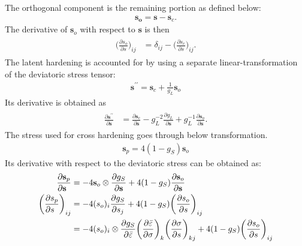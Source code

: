 \documentclass[12pt]{amsart}
\begin{document}
The orthogonal component is the remaining portion as defined below:
\begin{eqnarray}
  \label{eq:decomp3}
  \mathbf{s_o} = \mathbf{s} - \mathbf{s}_c.
\end{eqnarray}
The derivative of $\mathbf{s}_o$ with respect to $\mathbf{s}$ is then
\begin{eqnarray}
  \label{eq:decomp4}
  \begin{split}
    \bigg(\frac{\partial s_o}{\partial s}\bigg)_{ij} &= \delta_{ij}- \bigg(\frac{\partial s_c}{\partial s}\bigg)_{ij}.
  \end{split}
\end{eqnarray}
The latent hardening is accounted for by using a separate linear-transformation of the deviatoric stress tensor:
\begin{eqnarray}
  \label{eq:latent_decompose1}
  \mathbf{s}^{\prime\prime}=\mathbf{s}_c+\frac{1}{g_L}\mathbf{s}_o
\end{eqnarray}
Its derivative is obtained as
\begin{eqnarray}
  \begin{split}
    \label{eq:latent_decompose2}
    \frac{\partial\mathbf{s}^{\prime\prime}}{\partial\mathbf{s}} &=\frac{\partial\mathbf{s}_c}{\partial\mathbf{s}}-g_L^{-2}\frac{\partial g_L}{\partial \mathbf{s}} +g_L^{-1} \frac{\partial\mathbf{s}_o}{\partial\mathbf{s}}.
  \end{split}
\end{eqnarray}
The stress used for cross hardening goes through below transformation.
\begin{eqnarray}
  \label{eq:cross_linear1}
  \mathbf{s}_p = 4(1-g_S)\mathbf{s}_o
\end{eqnarray}
Its derivative with respect to the deviatoric stress can be obtained as:
\begin{eqnarray}
  \begin{split}
    \label{eq:cross_linear2}
    \frac{\partial\mathbf{s}_p}{\partial\mathbf{s}\hfill}  &= -4\mathbf{s}_o\otimes\frac{\partial g_S}{\partial \mathbf{s}}+4(1-g_S) \frac{\partial\mathbf{s}_o}{\partial\mathbf{s}} \\
    \bigg(\frac{\partial s_p}{\partial s\hfill} \bigg)_{ij} &= -4(s_o)_i\frac{\partial g_S}{\partial s_j} + 4(1-g_S) \bigg(\frac{\partial s_o}{\partial s}\bigg)_{ij}\\
    &= -4(s_o)_i\otimes\frac{\partial g_S}{\partial \bar{\varepsilon}}\bigg(\frac{\partial\bar{\varepsilon}}{\partial\sigma}\bigg)_k\bigg(\frac{\partial\sigma}{\partial s}\bigg)_{kj} + 4(1-g_S) \bigg(\frac{\partial s_o}{\partial s}\bigg)_{ij}
  \end{split}
\end{eqnarray}
\end{document}

